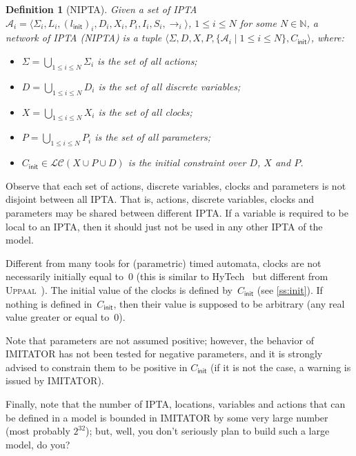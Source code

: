 \documentclass[a4paper,11pt]{report}
\def\init{\ensuremath{\textsf{init}}} %
\newcommand{\A}{\mathcal{A}}
\newcommand{\Action}{\ensuremath{\Sigma}}
\newcommand{\C}{C}
\newcommand{\Cinit}{\C_\init} %
\newcommand{\Clock}{X} %
\newcommand{\DVar}{D} %
\newcommand{\invariant}{I}
\newcommand{\LConstraint}{\mathcal{LC}} %
\newcommand{\LConstraintXPD}{\LConstraint(\Clock \cup \Param \cup \DVar)}
\newcommand{\loc}{l} %
\newcommand{\locinit}{\loc_\init}
\newcommand{\Loc}{L} %
\newcommand{\Param}{P} %
\newcommand{\steps}{ {\rightarrow} }
\newcommand{\stopwatches}{S}
\newcommand{\tuple}[1]{\langle#1\rangle}
\newcommand{\grandn}{{\mathbb N}}
\newcommand{\hytech}{{\sc HyTech}}
\newcommand{\imitator}{\textsf{IMITATOR}}
\newcommand{\IPTA}{IPTA}
\newcommand{\NIPTA}{NIPTA}
\newcommand{\uppaal}{\textsc{Uppaal}}
\newtheorem{definition}{Definition}
\begin{document}
\begin{definition}[\NIPTA{}]
	Given a set of \IPTA{} $\A_i = \tuple{\Action_i, \Loc_i, (\locinit)_i, \DVar_i, \Clock_i, \Param_i, \invariant_i, \stopwatches_i, \steps_i}$, $1 \leq i \leq N$ for some $N \in \grandn$,
	a network of \IPTA{} (\emph{\NIPTA{}}) is a tuple
		$\tuple{\Action, \DVar, \Clock, \Param, \{ \A_i \mid 1 \leq i \leq N \}, \Cinit}$, where:
	\begin{itemize}
		\item $\Action = \bigcup_{1 \leq i \leq N} \Action_i$ is the set of all actions;
		\item $\DVar = \bigcup_{1 \leq i \leq N} \DVar_i$ is the set of all discrete variables;
		\item $\Clock = \bigcup_{1 \leq i \leq N} \Clock_i$ is the set of all clocks;
		\item $\Param = \bigcup_{1 \leq i \leq N} \Param_i$ is the set of all parameters;
		\item $\Cinit \in \LConstraintXPD$ is the initial constraint over $\DVar$, $\Clock$ and $\Param$. %
	\end{itemize}
\end{definition}

Observe that each set of actions, discrete variables, clocks and parameters is not disjoint between all \IPTA{}.
That is, actions, discrete variables, clocks and parameters may be shared between different \IPTA{}.
If a variable is required to be local to an \IPTA{}, then it should just not be used in any other \IPTA{} of the model.

Different from many tools for (parametric) timed automata, clocks are not necessarily initially equal to~0 (this is similar to \hytech{}~\cite{HHW95} but different from \uppaal{}~\cite{LPY97}).
The initial value of the clocks is defined by~$\Cinit$ (see \cref{ss:init}).
If nothing is defined in~$\Cinit$, then their value is supposed to be arbitrary (any real value greater or equal to~0).

Note that parameters are not assumed positive; however, the behavior of \imitator{} has not been tested for negative parameters, and it is strongly advised to constrain them to be positive in $\Cinit$ (if it is not the case, a warning is issued by \imitator{}).


Finally, note that the number of \IPTA{}, locations, variables and actions that can be defined in a model is bounded in \imitator{} by some very large number (most probably $2^{32}$); but, well, you don't seriously plan to build such a large model, do you?
\end{document}
